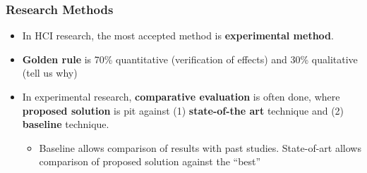 \documentclass{beamer}
\begin{document}
\begin{frame}
	\frametitle{Research Methods}
	\begin{itemize}
		\item In HCI research, the most accepted method is \textbf{experimental method}.  %
		\item \textbf{Golden rule} is 70\% quantitative (verification of effects) and 30\% qualitative (tell us why)
		\item In experimental research, \textbf{comparative evaluation} is often done, where \textbf{proposed solution} is pit against (1) \textbf{state-of-the art} technique and (2) \textbf{baseline} technique.  
		\begin{itemize}
			\item Baseline allows comparison of results with past studies.  State-of-art allows comparison of proposed solution against the ``best''
		\end{itemize}
	\end{itemize}
\end{frame}

\end{document}
